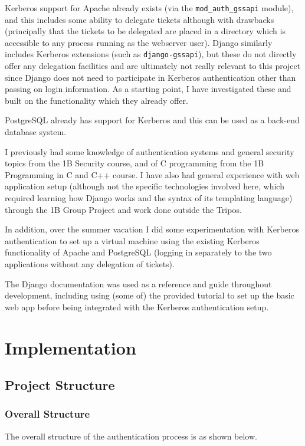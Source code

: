 \documentclass{report}
\begin{document}
Kerberos support for Apache already exists (via the \verb+mod_auth_gssapi+ module), and this includes some ability to delegate tickets although with drawbacks (principally that the tickets to be delegated are placed in a directory which is accessible to any process running as the webserver user). Django similarly includes Kerberos extensions (such as \verb+django-gssapi+), but these do not directly offer any delegation facilities and are ultimately not really relevant to this project since Django does not need to participate in Kerberos authentication other than passing on login information. As a starting point, I have investigated these and built on the functionality which they already offer.

PostgreSQL already has support for Kerberos and this can be used as a back-end database system.

I previously had some knowledge of authentication systems and general security topics from the 1B Security course, and of C programming from the 1B Programming in C and C++ course. I have also had general experience with web application setup (although not the specific technologies involved here, which required learning how Django works and the syntax of its templating language) through the 1B Group Project and work done outside the Tripos.

In addition, over the summer vacation I did some experimentation with Kerberos authentication to set up a virtual machine using the existing Kerberos functionality of Apache and PostgreSQL (logging in separately to the two applications without any delegation of tickets).

The Django documentation\cite{Django-docs} was used as a reference and guide throughout development, including using (some of) the provided tutorial to set up the basic web app before being integrated with the Kerberos authentication setup.


\chapter{Implementation}

\section{Project Structure}

\subsection{Overall Structure}
The overall structure of the authentication process is as shown below.
\end{document}
